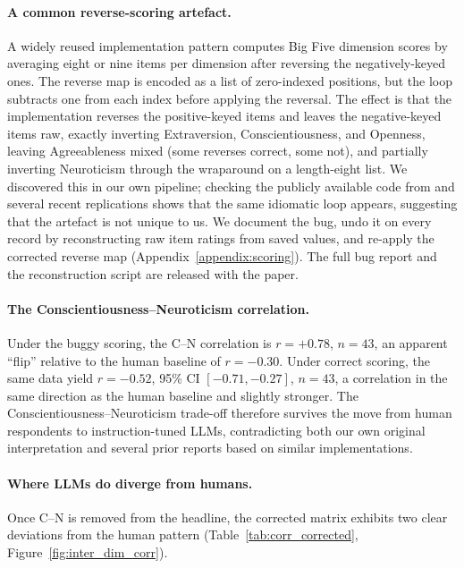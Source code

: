 \documentclass[11pt]{article}
\begin{document}
\paragraph{A common reverse-scoring artefact.}
A widely reused implementation pattern computes Big Five dimension scores by averaging eight or nine items per dimension after reversing the negatively-keyed ones.
The reverse map is encoded as a list of zero-indexed positions, but the loop subtracts one from each index before applying the reversal.
The effect is that the implementation reverses the positive-keyed items and leaves the negative-keyed items raw, exactly inverting Extraversion, Conscientiousness, and Openness, leaving Agreeableness mixed (some reverses correct, some not), and partially inverting Neuroticism through the wraparound on a length-eight list.
We discovered this in our own pipeline; checking the publicly available code from \citet{schaekermann2024personality} and several recent replications shows that the same idiomatic loop appears, suggesting that the artefact is not unique to us.
We document the bug, undo it on every record by reconstructing raw item ratings from saved values, and re-apply the corrected reverse map (Appendix~\ref{appendix:scoring}).
The full bug report and the reconstruction script are released with the paper.

\paragraph{The Conscientiousness--Neuroticism correlation.}
Under the buggy scoring, the C--N correlation is $r = +0.78$, $n = 43$, an apparent ``flip'' relative to the human baseline of $r = -0.30$.
Under correct scoring, the same data yield $r = -0.52$, 95\% CI $[-0.71, -0.27]$, $n = 43$, a correlation in the same direction as the human baseline and slightly stronger.
The Conscientiousness--Neuroticism trade-off therefore survives the move from human respondents to instruction-tuned LLMs, contradicting both our own original interpretation and several prior reports based on similar implementations.

\paragraph{Where LLMs do diverge from humans.}
Once C--N is removed from the headline, the corrected matrix exhibits two clear deviations from the human pattern (Table~\ref{tab:corr_corrected}, Figure~\ref{fig:inter_dim_corr}).
\end{document}
